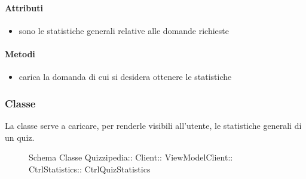 \paragraph{Attributi}
\begin{itemize}
\item {}
\newline
sono le statistiche generali relative alle domande richieste
\end{itemize}
\paragraph{Metodi}
\begin{itemize}
\item {}
\newline
carica la domanda di cui si desidera ottenere le statistiche
\newline
\end{itemize}
\subsubsection{Classe }
La classe serve a caricare, per renderle visibili all'utente, le statistiche generali di un quiz.
\begin{figure}[H]
\centering
\noindent{}
\caption[Schema Classe CtrlQuizStatistics]{Schema Classe Quizzipedia:: Client:: ViewModelClient:: CtrlStatistics:: CtrlQuizStatistics}
\end{figure}
